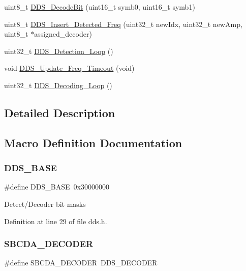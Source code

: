 \begin{DoxyCompactItemize}
\item 
uint8\+\_\+t \hyperlink{group___d_d_s_ga249a36f3fa12baff1cf03b7f6a8a0cac}{D\+D\+S\+\_\+\+Decode\+Bit} (uint16\+\_\+t symb0, uint16\+\_\+t symb1)
\item 
uint8\+\_\+t \hyperlink{group___d_d_s_ga4543aee7394ebf3441baf1f25c7c223c}{D\+D\+S\+\_\+\+Insert\+\_\+\+Detected\+\_\+\+Freq} (uint32\+\_\+t new\+Idx, uint32\+\_\+t new\+Amp, uint8\+\_\+t $\ast$assigned\+\_\+decoder)
\item 
uint32\+\_\+t \hyperlink{group___d_d_s_ga1f53b4fdeb56f560600428473023f819}{D\+D\+S\+\_\+\+Detection\+\_\+\+Loop} ()
\item 
void \hyperlink{group___d_d_s_ga391db24a133ffa19533b5845c365367d}{D\+D\+S\+\_\+\+Update\+\_\+\+Freq\+\_\+\+Timeout} (void)
\item 
uint32\+\_\+t \hyperlink{group___d_d_s_ga0d11598fca2a9f0eceb43f06a0fb2c4e}{D\+D\+S\+\_\+\+Decoding\+\_\+\+Loop} ()
\end{DoxyCompactItemize}


\subsection{Detailed Description}


\subsection{Macro Definition Documentation}
\mbox{\label{group___d_d_s_gaae9812f46efd3711214d66ec5bd90674}} 
\subsubsection{\texorpdfstring{D\+D\+S\+\_\+\+B\+A\+SE}{DDS\_BASE}}
{\footnotesize\ttfamily \#define D\+D\+S\+\_\+\+B\+A\+SE~0x30000000}

Detect/\+Decoder bit masks 

Definition at line 29 of file dds.\+h.

\mbox{\label{group___d_d_s_ga61f7ba6d9616f3c1b1dd1ac799428fd1}} 
\subsubsection{\texorpdfstring{S\+B\+C\+D\+A\+\_\+\+D\+E\+C\+O\+D\+ER}{SBCDA\_DECODER}}
{\footnotesize\ttfamily \#define S\+B\+C\+D\+A\+\_\+\+D\+E\+C\+O\+D\+ER~D\+D\+S\+\_\+\+D\+E\+C\+O\+D\+ER}

